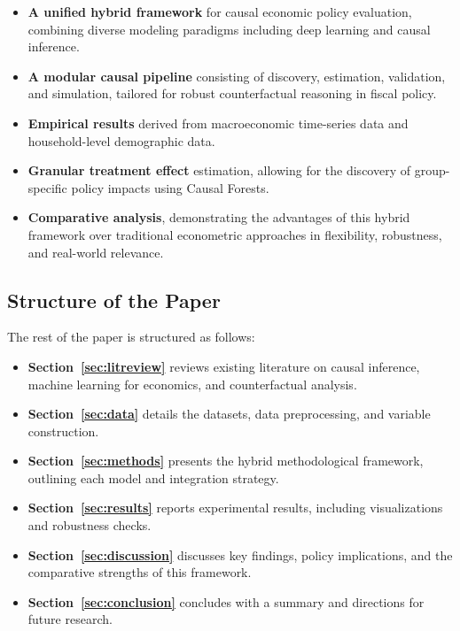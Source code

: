 \begin{itemize}
    \item \textbf{A unified hybrid framework} for causal economic policy evaluation, combining diverse modeling paradigms including deep learning and causal inference.
    
    \item \textbf{A modular causal pipeline} consisting of discovery, estimation, validation, and simulation, tailored for robust counterfactual reasoning in fiscal policy.
    
    \item \textbf{Empirical results} derived from macroeconomic time-series data and household-level demographic data.
    
    \item \textbf{Granular treatment effect} estimation, allowing for the discovery of group-specific policy impacts using Causal Forests.
    
    \item \textbf{Comparative analysis}, demonstrating the advantages of this hybrid framework over traditional econometric approaches in flexibility, robustness, and real-world relevance.
\end{itemize}

\subsection{Structure of the Paper}\label{subsec:structure}

The rest of the paper is structured as follows:

\begin{itemize}
    \item \textbf{Section~\ref{sec:litreview}} reviews existing literature on causal inference, machine learning for economics, and counterfactual analysis.
    
    \item \textbf{Section~\ref{sec:data}} details the datasets, data preprocessing, and variable construction.
    
    \item \textbf{Section~\ref{sec:methods}} presents the hybrid methodological framework, outlining each model and integration strategy.
    
    \item \textbf{Section~\ref{sec:results}} reports experimental results, including visualizations and robustness checks.
    
    \item \textbf{Section~\ref{sec:discussion}} discusses key findings, policy implications, and the comparative strengths of this framework.
    
    \item \textbf{Section~\ref{sec:conclusion}} concludes with a summary and directions for future research.
\end{itemize}

